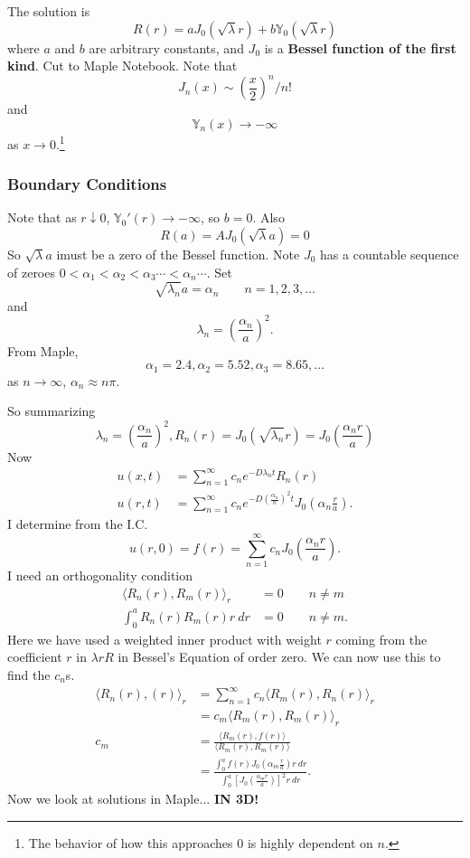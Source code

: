 \documentclass[cm]{article}
\begin{document}
The solution is
$$ R(r) = aJ_0(\sqrt{\lambda}r) + b \mathbb Y_0(\sqrt{\lambda}r)$$
where $a$ and $b$ are arbitrary constants, and $J_0$ is a {\bf Bessel function
of the first kind}. Cut to Maple Notebook. Note that
$$J_n(x) \sim \left(\frac{x}{2}\right)^n / n!$$
and $$\mathbb Y_n(x) \to - \infty$$ as $x \to 0$.\footnote{The behavior of how
this approaches $0$ is highly dependent on $n$.}
\subsubsection{Boundary Conditions}
Note that as $r \downarrow 0$, $\mathbb Y_0'(r) \to - \infty$, so $b = 0$. Also
$$R(a) = AJ_0(\sqrt{\lambda}a) = 0$$
So $\sqrt{\lambda}a$ imust be a zero of the Bessel function. Note $J_0$ has a
countable sequence of zeroes $0 < \alpha_1 < \alpha_2 < \alpha_3 \cdots <
\alpha_n \cdots$. Set
$$\sqrt{\lambda_n}a = \alpha_n \qquad n = 1,2,3,\ldots$$
and
$$\lambda_n = \left(\frac{\alpha_n}{a}\right)^2.$$
From Maple,
$$\alpha_1 = 2.4, \alpha_2 = 5.52, \alpha_3 = 8.65, \ldots$$
as $n \to \infty$, $\alpha_n \approx n \pi$.

So summarizing
$$\lambda_n = \left(\frac{\alpha_n}{a}\right)^2, R_n(r) = J_0(\sqrt{\lambda_n}r)
    = J_0\left(\frac{\alpha_n r}{a}\right)$$
Now
\begin{align*}
u(x,t) &= \sum_{n = 1}^{\infty} c_n e^{- D \lambda_n t} R_n(r) \\
u(r,t) &= \sum_{n = 1}^{\infty} c_n e^{-D \left(\frac{\alpha_n}{n}\right)^2 t}
J_0(\alpha_n \frac{r}{a}).
\end{align*}
I determine from the I.C.
$$u(r,0) = f(r) = \sum_{n = 1}^{\infty} c_n J_0(\frac{\alpha_n r}{a}).$$
I need an orthogonality condition
\begin{align*}
\langle R_n(r), R_m(r) \rangle_r &= 0 \qquad n \neq m \\
\int_0^a R_n(r) R_m(r) r ~dr &= 0 \qquad n \neq m.
\end{align*}
Here we have used a weighted inner product with weight $r$ coming from the
coefficient $r$ in $\lambda r R$ in Bessel's Equation of order zero. We can now
use this to find the $c_n$s.
\begin{align*}
\langle R_n(r), (r) \rangle_r &= \sum_{n = 1}^{\infty} c_n \langle R_m(r),
    R_n(r) \rangle_r \\
    &= c_m \langle R_m(r), R_m(r) \rangle_r \\
c_m &= \frac{\langle R_m(r), f(r) \rangle}{\langle R_m(r), R_m(r) \rangle} \\
    &= \frac{\int_0^a f(r) J_0(\alpha_m \frac{r}{a})r~dr}{\int_0^a
        [J_0(\frac{\alpha_mr}{a})]^2r~dr}.
\end{align*}
Now we look at solutions in Maple$\ldots$ {\bf IN 3D!}
\end{document}
